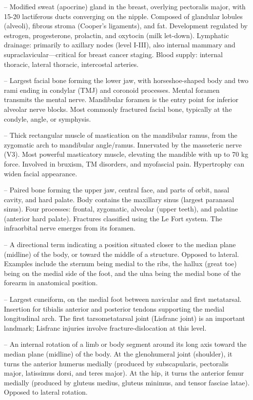 -- Modified sweat (apocrine) gland in the breast, overlying pectoralis major, with 15-20 lactiferous ducts converging on the nipple. Composed of glandular lobules (alveoli), fibrous stroma (Cooper's ligaments), and fat. Development regulated by estrogen, progesterone, prolactin, and oxytocin (milk let-down). Lymphatic drainage: primarily to axillary nodes (level I-III), also internal mammary and supraclavicular—critical for breast cancer staging. Blood supply: internal thoracic, lateral thoracic, intercostal arteries.

-- Largest facial bone forming the lower jaw, with horseshoe-shaped body and two rami ending in condylar (TMJ) and coronoid processes. Mental foramen transmits the mental nerve. Mandibular foramen is the entry point for inferior alveolar nerve blocks. Most commonly fractured facial bone, typically at the condyle, angle, or symphysis.

-- Thick rectangular muscle of mastication on the mandibular ramus, from the zygomatic arch to mandibular angle/ramus. Innervated by the masseteric nerve (V3). Most powerful masticatory muscle, elevating the mandible with up to 70 kg force. Involved in bruxism, TM disorders, and myofascial pain. Hypertrophy can widen facial appearance.

-- Paired bone forming the upper jaw, central face, and parts of orbit, nasal cavity, and hard palate. Body contains the maxillary sinus (largest paranasal sinus). Four processes: frontal, zygomatic, alveolar (upper teeth), and palatine (anterior hard palate). Fractures classified using the Le Fort system. The infraorbital nerve emerges from its foramen.

-- A directional term indicating a position situated closer to the median plane (midline) of the body, or toward the middle of a structure. Opposed to lateral. Examples include the sternum being medial to the ribs, the hallux (great toe) being on the medial side of the foot, and the ulna being the medial bone of the forearm in anatomical position.

-- Largest cuneiform, on the medial foot between navicular and first metatarsal. Insertion for tibialis anterior and posterior tendons supporting the medial longitudinal arch. The first tarsometatarsal joint (Lisfranc joint) is an important landmark; Lisfranc injuries involve fracture-dislocation at this level.

-- An internal rotation of a limb or body segment around its long axis toward the median plane (midline) of the body. At the glenohumeral joint (shoulder), it turns the anterior humerus medially (produced by subscapularis, pectoralis major, latissimus dorsi, and teres major). At the hip, it turns the anterior femur medially (produced by gluteus medius, gluteus minimus, and tensor fasciae latae). Opposed to lateral rotation.

